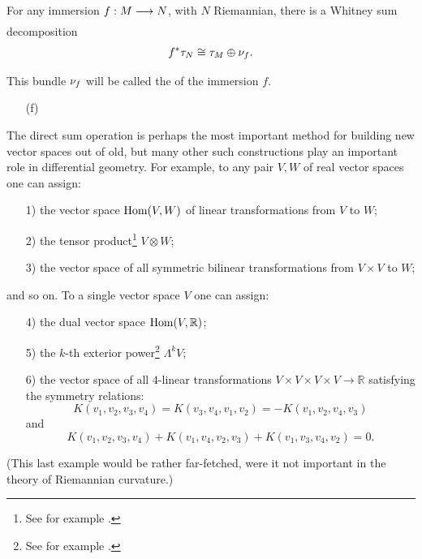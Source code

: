 \documentclass[../main]{subfiles}
\begin{document}
\begin{corollary}\label{cor:03.05}
For any immersion $f : M\varrightarrow{} N$, with $N$ Riemannian, there is a Whitney sum decomposition
\[
f^*\tau_{N} \cong \tau_{M} \oplus \nu_{f}.
\]
\end{corollary}
This bundle $\nu_{f}$ will be called the  of the immersion $f$.


\begin{enumerate}
    \item[(f)] 
\end{enumerate}
The direct sum operation is perhaps the most important method for building new vector spaces out of old, but many other such constructions play an important role in differential geometry. For example, to any pair $V, W$ of real vector spaces one can assign:

\begin{enumerate}\label{functors on vectors}
	\item[1)] the vector space $\operatorname{Hom}(V, W)$ of linear transformations from $V$ to  $W$;
	\item[2)] the tensor product\footnote{See for example \cite[pp. 408]{lang1965algebra}.} $V\otimes W$;
	\item[3)] the vector space of all symmetric bilinear transformations from $V \times V$ to $W$;
\end{enumerate}

and so on. To a single vector space $V$ one can assign:

\begin{enumerate} 
	\item[4)] the dual vector space $\operatorname{Hom}(V, \mathbb R) $; 
	\item[5)] the $k$-th exterior power\footnote{See for example \cite[pp. 424]{lang1965algebra}.} $\Lambda^k V$;
	\item[6)] the vector space of all $4$-linear transformations
	$V \times V\times V \times V\to \mathbb{R}$ satisfying the symmetry relations:
	\[
	K(v_1,v_2,v_3,v_4)=K(v_3,v_4,v_1,v_2)=-K(v_1,v_2,v_4,v_3)
	\]
	and
	\[
	K(v_1,v_2,v_3,v_4)+K(v_1,v_4,v_2,v_3)+K(v_1,v_3,v_4,v_2)=0.
	\]
\end{enumerate}

(This last example would be rather far-fetched, were it not important in the theory of Riemannian curvature.)
\end{document}
